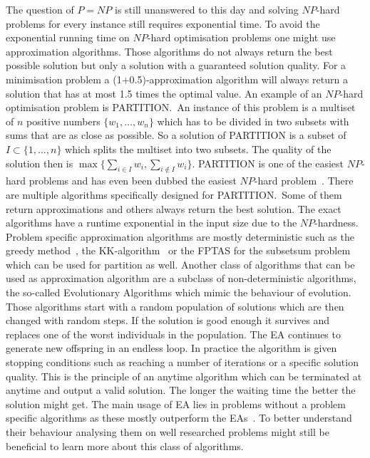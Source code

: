 The question of $P=NP$ is still unanswered to this day and solving $NP$-hard problems for every instance still requires exponential time.
To avoid the exponential running time on $NP$-hard optimisation problems one might use approximation algorithms.
Those algorithms do not always return the best possible solution but only a solution with a guaranteed solution quality.
For a minimisation problem a (1+0.5)-approximation algorithm will always return a solution that has at most 1.5 times the optimal value.
An example of an $NP$-hard optimisation problem is PARTITION.\ 
An instance of this problem is a multiset of $n$ positive numbers $\{w_1,\dots,w_n\}$ which has to be divided in two subsets with sums that are as close as possible.
So a solution of PARTITION is a subset of $I\subset \{1,\dots,n\}$ which splits the multiset into two subsets.
The quality of the solution then is $\max\{\sum_{i\in I}w_i, \sum_{i\notin I}w_i\}$.
PARTITION is one of the easiest $NP$-hard problems and has even been dubbed the easiest $NP$-hard problem~\cite{hayes2002computing}.
There are multiple algorithms specifically designed for PARTITION.\ 
Some of them return approximations and others always return the best solution.
The exact algorithms have a runtime exponential in the input size due to the $NP$-hardness.
Problem specific approximation algorithms are mostly deterministic such as the greedy method~\cite{graham1966bounds}, the KK-algorithm~\cite{karmarkar1982differencing} or the FPTAS for the subsetsum problem~\cite{KELLERER2003349} which can be used for partition as well.
Another class of algorithms that can be used as approximation algorithm are a subclass of non-deterministic algorithms, the so-called Evolutionary Algorithms which mimic the behaviour of evolution.
Those algorithms start with a random population of solutions which are then changed with random steps.
If the solution is good enough it survives and replaces one of the worst individuals in the population.
The EA continues to generate new offspring in an endless loop.
In practice the algorithm is given stopping conditions such as reaching a number of iterations or a specific solution quality.
This is the principle of an anytime algorithm which can be terminated at anytime and output a valid solution.
The longer the waiting time the better the solution might get.
The main usage of EA lies in problems without a problem specific algorithms as these mostly outperform the EAs~\cite{scharnow2005analysis}.
To better understand their behaviour analysing them on well researched problems might still be beneficial to learn more about this class of algorithms.
